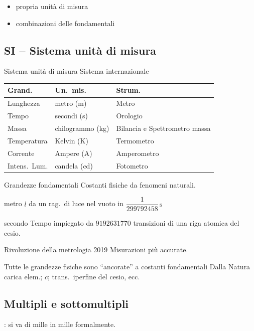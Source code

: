 \documentclass[11pt,a4paper,openany]{report}
\begin{document}
\begin{itemize}
  \item {} \implica propria unità di misura
  \item {} \implica combinazioni delle fondamentali
\end{itemize}

\subsection{SI -- Sistema unità di misura}
 Sistema unità di misura \implica Sistema internazionale

\begin{center}
\begin{tabular}{lll}
\toprule
\textbf{Grand.} & \textbf{Un.\ mis.} & \textbf{Strum.} \\
\midrule
Lunghezza & metro (m) & Metro \\
Tempo & secondi (s) & Orologio \\
Massa & chilogrammo (kg) & Bilancia e Spettrometro massa \\
Temperatura & Kelvin (K) & Termometro \\
Corrente & Ampere (A) & Amperometro \\
Intens.\ Lum. & candela (cd) & Fotometro \\
\bottomrule
\end{tabular}
\end{center}

Grandezze fondamentali \implica Costanti fisiche da fenomeni naturali.

\begin{esempio}{metro}
$l$ da un rag.\ di luce nel vuoto in $\dfrac{1}{299792458}\,\mathrm{s}$
\end{esempio}
\begin{esempio}{secondo}
Tempo impiegato da $9192631770$ transizioni di una riga atomica del cesio.
\end{esempio}

Rivoluzione della metrologia 2019 \implica Misurazioni più accurate.

Tutte le grandezze fisiche sono ``ancorate'' a costanti fondamentali
\implica Dalla Natura \implica carica elem.; $c$; trans.\ iperfine del cesio, ecc.

\subsection{Multipli e sottomultipli}
: si va di mille in mille \implica formalmente.
\end{document}
